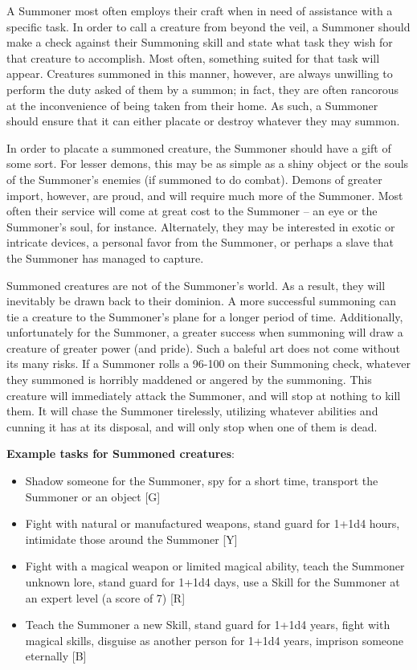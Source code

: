 \documentclass[oneside]{book}
\begin{document}
\begin{multicols}{2}
A Summoner most often employs their craft when in need of assistance with a specific task. In order to call a creature from beyond the veil, a Summoner should make a check against their Summoning skill and state what task they wish for that creature to accomplish. Most often, something suited for that task will appear. Creatures summoned in this manner, however, are always unwilling to perform the duty asked of them by a summon; in fact, they are often rancorous at the inconvenience of being taken from their home. As such, a Summoner should ensure that it can either placate or destroy whatever they may summon. 

In order to placate a summoned creature, the Summoner should have a gift of some sort. For lesser demons, this may be as simple as a shiny object or the souls of the Summoner's enemies (if summoned to do combat). Demons of greater import, however, are proud, and will require much more of the Summoner. Most often their service will come at great cost to the Summoner -- an eye or the Summoner's soul, for instance. Alternately, they may be interested in exotic or intricate devices, a personal favor from the Summoner, or perhaps a slave that the Summoner has managed to capture. 

Summoned creatures are not of the Summoner's world. As a result, they will inevitably be drawn back to their dominion. A more successful summoning can tie a creature to the Summoner's plane for a longer period of time. Additionally, unfortunately for the Summoner, a greater success when summoning will draw a creature of greater power (and pride). Such a baleful art does not come without its many risks. If a Summoner rolls a 96-100 on their Summoning check, whatever they summoned is horribly maddened or angered by the summoning. This creature will immediately attack the Summoner, and will stop at nothing to kill them. It will chase the Summoner tirelessly, utilizing whatever abilities and cunning it has at its disposal, and will only stop when one of them is dead.

\textbf{Example tasks for Summoned creatures}: 
	\begin{itemize}
		\setlength{\itemsep}{0cm}%
  		\setlength{\parskip}{0cm}%
		\item{ \small Shadow someone for the Summoner, spy for a short time, transport the Summoner or an object [G]}
		\item{ \small Fight with natural or manufactured weapons, stand guard for 1+1d4 hours, intimidate those around the Summoner  [Y]}
		\item{ \small Fight with a magical weapon or limited magical ability, teach the Summoner unknown lore, stand guard for 1+1d4 days, use a Skill for the Summoner at an expert level (a score of 7) [R]}
		\item{ \small Teach the Summoner a new Skill, stand guard for 1+1d4 years, fight with magical skills, disguise as another person for 1+1d4 years, imprison someone eternally  [B]}
	\end{itemize}


\end{multicols}
\end{document}
